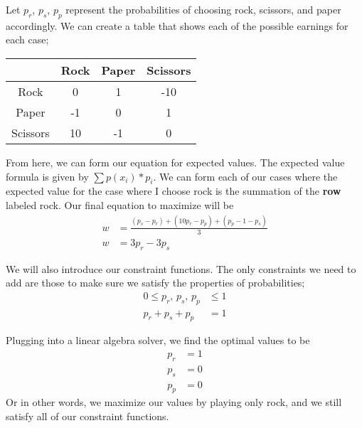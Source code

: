 \documentclass{article}
\begin{document}
\begin{enumerate}
\begin{enumerate}


Let $p_r$, $p_s$, $p_p$ represent the probabilities of choosing rock, scissors, and paper accordingly. We can create a table that shows each of the possible earnings for each case; 

\begin{table}[h!]
    \centering
    \begin{tabular}{c|c|c|c}
         & Rock & Paper & Scissors \\ \hline
        Rock & 0 & 1 & -10 \\ \hline
        Paper & -1 & 0 & 1 \\ \hline 
        Scissors & 10 & -1 & 0 \\ 
    \end{tabular}
\end{table}

From here, we can form our equation for expected values. The expected value formula is given by $\sum p(x_i) * p_i$. We can form each of our cases where the expected value for the case where I choose rock is the summation of the \textbf{row} labeled rock. Our final equation to maximize will be 
\begin{align*}
    w & = \frac{(p_s - p_r) + (10p_r - p_p) + (p_p - 1-p_s)}{3} \\
    w & = 3p_r - 3p_s
\end{align*}

We will also introduce our constraint functions. The only constraints we need to add are those to make sure we satisfy the properties of probabilities; 
\begin{align*}
    0 \leq p_r \text{, } p_s \text{, } p_p & \leq 1 \\
    p_r + p_s + p_p & = 1
\end{align*}

Plugging into a linear algebra solver, we find the optimal values to be 
\begin{align*}
    p_r & = 1 \\
    p_s & = 0 \\
    p_p & = 0
\end{align*}
Or in other words, we maximize our values by playing only rock, and we still satisfy all of our constraint functions. 









\end{enumerate}
\end{enumerate}
\end{document}
